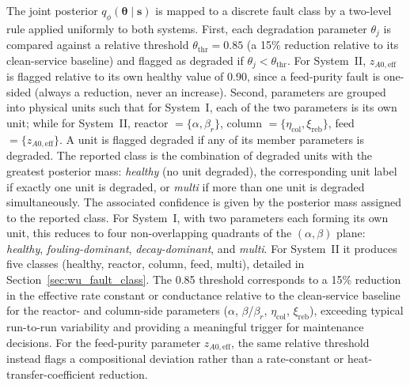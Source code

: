 \documentclass[aps,pre,twocolumn,superscriptaddress]{revtex4-2}
\begin{document}
\label{sec:fault_class}
The joint posterior $q_\phi(\boldsymbol{\theta}\mid\mathbf{s})$ is mapped to a discrete fault class by a two-level rule applied uniformly to both systems. First, each degradation parameter $\theta_j$ is compared against a relative threshold $\theta_\mathrm{thr}=0.85$ (a 15\% reduction relative to its clean-service baseline) and flagged as degraded if $\theta_j<\theta_\mathrm{thr}$. For System~II, $z_{A0,\mathrm{eff}}$ is flagged relative to its own healthy value of 0.90, since a feed-purity fault is one-sided (always a reduction, never an increase). Second, parameters are grouped into physical units such that for System~I, each of the two parameters is its own unit; while for System~II, reactor $=\{\alpha,\beta_r\}$, column $=\{\eta_\mathrm{col},\xi_\mathrm{reb}\}$, feed $=\{z_{A0,\mathrm{eff}}\}$. A unit is flagged degraded if any of its member parameters is degraded. The reported class is the combination of degraded units with the greatest posterior mass: \emph{healthy} (no unit degraded), the corresponding unit label if exactly one unit is degraded, or \emph{multi} %
if more than one unit is degraded simultaneously. The associated confidence is given by the posterior mass assigned to the reported class. For System~I, with two parameters each forming its own unit, this reduces to four non-overlapping quadrants of the $(\alpha,\beta)$ plane: \emph{healthy}, \emph{fouling-dominant}, \emph{decay-dominant}, and \emph{multi}. For System~II it produces five classes (healthy, reactor, column, feed, multi), detailed in Section~\ref{sec:wu_fault_class}. The 0.85 threshold corresponds to a 15\% reduction in the effective rate constant or conductance relative to the clean-service baseline for the reactor- and column-side parameters ($\alpha$, $\beta$/$\beta_r$, $\eta_\mathrm{col}$, $\xi_\mathrm{reb}$), exceeding typical run-to-run variability and providing a meaningful trigger for maintenance decisions. For the feed-purity parameter $z_{A0,\mathrm{eff}}$, the same relative threshold instead flags a compositional deviation rather than a rate-constant or heat-transfer-coefficient reduction.
\end{document}
